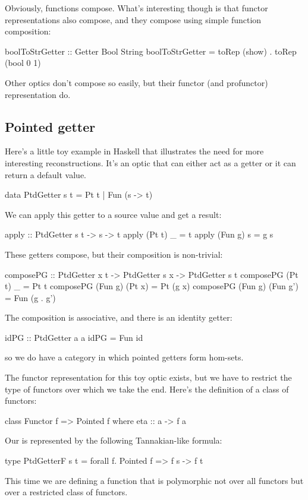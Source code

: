 \documentclass[DaoFP]{subfiles}
\begin{document}
Obviously, functions compose. What's interesting though is that functor representations also compose, and they compose using simple function composition:
\begin{haskell}
boolToStrGetter :: Getter Bool String
boolToStrGetter = toRep (show) . toRep (bool 0 1)
\end{haskell}
Other optics don't compose so easily, but their functor (and profunctor) representation do. 
\subsection{Pointed getter}

Here's a little toy example in Haskell that illustrates the need for more interesting reconstructions. It's an optic that can either act as a getter or it can return a default value.
\begin{haskell}
data PtdGetter s t = Pt t | Fun (s -> t)
\end{haskell}
We can apply this getter to a source value and get a result:
\begin{haskell}
apply :: PtdGetter s t -> s -> t
apply (Pt t) _ = t
apply (Fun g) s = g s
\end{haskell}

These getters compose, but their composition is non-trivial:
\begin{haskell}
composePG :: PtdGetter x t -> PtdGetter s x -> PtdGetter s t
composePG (Pt t) _ = Pt t
composePG (Fun g) (Pt x) = Pt (g x)
composePG (Fun g) (Fun g') = Fun (g . g')
\end{haskell}
The composition is associative, and there is an identity getter:
\begin{haskell}
idPG :: PtdGetter a a
idPG = Fun id
\end{haskell}
so we do have a category in which pointed getters form hom-sets. 

The functor representation for this toy optic exists, but we have to restrict the type of functors over which we take the end. Here's the definition of a class of  functors:
\begin{haskell}
class Functor f => Pointed f where
  eta :: a -> f a
\end{haskell}
Our  is represented by the following Tannakian-like formula:
\begin{haskell}
type PtdGetterF s t = forall f. Pointed f => f s -> f t
\end{haskell}
This time we are defining a function that is polymorphic not over all functors but over a restricted class of  functors.
\end{document}
